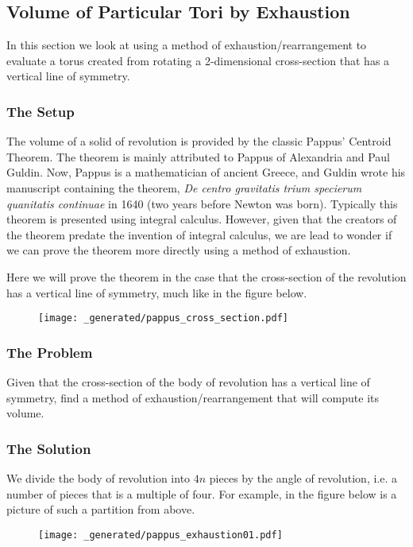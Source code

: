 \subsection{Volume of Particular Tori by Exhaustion}

In this section we look at using a method of exhaustion/rearrangement to evaluate a torus created from rotating
a 2-dimensional cross-section that has a vertical line of symmetry. 

\subsubsection*{The Setup}

The volume of a solid of revolution is provided by the classic Pappus' Centroid Theorem. The
theorem is mainly attributed to Pappus of Alexandria and Paul Guldin. Now, Pappus is a
mathematician of ancient Greece, and Guldin wrote his manuscript containing the theorem,
\textit{De centro gravitatis trium specierum quanitatis continuae} in 1640 (two years before
Newton was born). Typically this theorem is presented using integral calculus. However, given
that the creators of the theorem predate the invention of integral calculus, we are lead to wonder
if we can prove the theorem more directly using a method of exhaustion.

Here we will prove the theorem in the case that the cross-section of the revolution has a vertical
line of symmetry, much like in the figure below.

\begin{figure}[h]
\centering
\texttt{[image: \_generated/pappus\_cross\_section.pdf]}
\end{figure}

\subsubsection*{The Problem}

Given that the cross-section of the body of revolution has a vertical line of symmetry, find a
method of exhaustion/rearrangement that will compute its volume.

\subsubsection*{The Solution}

We divide the body of revolution into \(4n\) pieces by the angle of revolution, i.e. a number of 
pieces that is a multiple of four. For example, in the figure below is a picture of such a partition
from above.
\begin{figure}[h]
\centering
\texttt{[image: \_generated/pappus\_exhaustion01.pdf]}
\end{figure}

